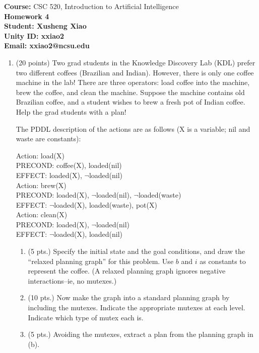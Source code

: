 \documentclass{article}%
\begin{document}
\begin{flushleft}
\textbf{Course:} CSC 520, Introduction to Artificial Intelligence\\
\textbf{Homework 4}\\
\textbf{Student: Xusheng Xiao} \\
\textbf{Unity ID: xxiao2} \\
\textbf{Email: xxiao2@ncsu.edu}
\end{flushleft}

\noindent{\hrulefill}

\bigskip

\begin{enumerate}
  \item (20 points) Two grad students in the Knowledge Discovery Lab (KDL) prefer two different coffees (Brazilian and Indian). However, there is only one coffee machine in the lab! There are three operators: load coffee into the machine, brew the coffee, and clean the machine. Suppose the machine contains old Brazilian coffee, and a student wishes to brew a fresh pot of Indian coffee. Help the grad students with a plan!
  
The PDDL description of the actions are as follows (X is a variable; nil and waste are constants):

Action: load(X)	 \\
\hspace*{6ex} 	PRECOND: coffee(X), loaded(nil) \\
\hspace*{6ex} 	EFFECT: loaded(X), $\neg$loaded(nil)\\
Action: brew(X)	 \\
\hspace*{6ex} 	PRECOND: loaded(X), $\neg$loaded(nil), $\neg$loaded(waste)\\
\hspace*{6ex} 	EFFECT: $\neg$loaded(X), loaded(waste), pot(X)\\
Action: clean(X)	 \\
\hspace*{6ex} 	PRECOND: loaded(X), $\neg$loaded(nil)\\
\hspace*{6ex} 	EFFECT: $\neg$loaded(X), loaded(nil)\\
 	
\begin{enumerate}
  \item (5 pts.) Specify the initial state and the goal conditions, and draw the ``relaxed planning graph'' for this problem. Use $b$ and $i$ as constants to represent the coffee. (A relaxed planning graph ignores negative interactions--ie, no mutexes.)
  \item (10 pts.) Now make the graph into a standard planning graph by including the mutexes. Indicate the appropriate mutexes at each level. Indicate which type of mutex each is.
  \item (5 pts.) Avoiding the mutexes, extract a plan from the planning graph in (b).
\end{enumerate} 	


\end{enumerate}
\end{document}
